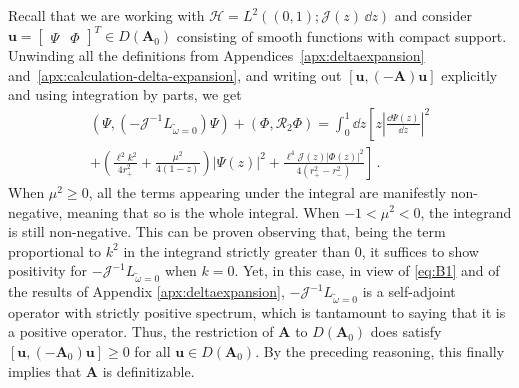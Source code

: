 \documentclass[aps, prd, amsmath, floats, floatfix, twocolumn, nofootinbib, superscriptaddress, showpacs]{revtex4-1}
\def\H{\mathcal{H}}
\def\A{\mathbf{A}}
\def\cJ{\mathcal{J}}
\def\cR{\mathcal{R}}
\def\tomega{{\tilde{\omega}}}
\begin{document}
Recall that we are working with $\H = L^2((0,1); \cJ(z)\, \dd{z})$ and
consider $\mathbf{u} = [\begin{matrix} \Psi & \Phi
\end{matrix}]^T \in D(\A_0)$ consisting of smooth functions with
compact support. Unwinding all the definitions from
Appendices~\ref{apx:deltaexpansion} and~\ref{apx:calculation-delta-expansion}, and writing out
$[\mathbf{u}, (-\A) \mathbf{u}]$ explicitly and using integration by
parts, we get
%
\begin{multline*}
	(\Psi, (-\cJ^{-1} L_{\tomega=0}) \Psi) + (\Phi, \cR_2 \Phi)
	= \int_0^1 \dd{z} \left[z \left|\frac{\dd \Psi(z)}{\dd z}\right|^2 \right. 
	\\
	\left. + \left(\frac{\ell^2 k^2}{4 r_+^2} + \frac{\mu^2}{4(1-z)}\right) |\Psi(z)|^2
	+ \frac{\ell^4 \cJ(z) |\Phi(z)|^2}{4 (r_+^2-r_-^2)}
	\right]
	\, . \label{eq:integrand}
\end{multline*}
%
When $\mu^2\geqslant 0$, all the terms appearing under the integral are
manifestly non-negative, meaning that so is the whole integral. When
$-1 < \mu^2 < 0$, the integrand is still non-negative. 
This can be proven observing that, being the term proportional to $k^2$ in the integrand strictly greater than $0$, it suffices to show positivity for $-\mathcal{J}^{-1}L_{\tomega=0}$ when $k=0$. Yet, in this case, in view of \eqref{eq:B1} and of the results of Appendix \ref{apx:deltaexpansion}, $-\mathcal{J}^{-1}L_{\tomega=0}$ is a self-adjoint operator with strictly positive spectrum, which is tantamount to saying that it is a positive operator.
Thus, the restriction of $\A$ to $D(\A_0)$ does satisfy $[\mathbf{u}, (-\A_0)
\mathbf{u}] \geqslant 0$ for all $\mathbf{u} \in D(\A_0)$. By the
preceding reasoning, this finally implies that $\A$ is definitizable.


\end{document}
